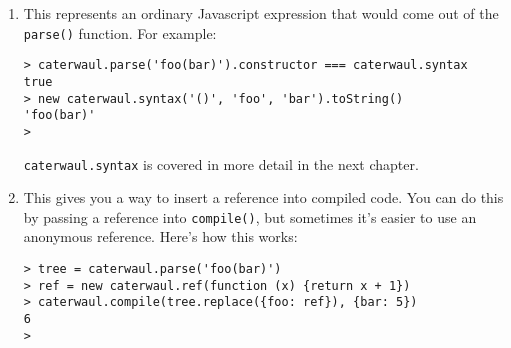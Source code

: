 \documentclass{report}
\begin{document}
\begin{enumerate}
\item[{\tt caterwaul.syntax}]
  This represents an ordinary Javascript expression that would come out of the {\tt parse()} function. For example:

\begin{verbatim}
> caterwaul.parse('foo(bar)').constructor === caterwaul.syntax
true
> new caterwaul.syntax('()', 'foo', 'bar').toString()
'foo(bar)'
>
\end{verbatim}

  {\tt caterwaul.syntax} is covered in more detail in the next chapter.

\item[{\tt caterwaul.ref}]
  This gives you a way to insert a reference into compiled code. You can do this by passing a reference into {\tt compile()}, but sometimes it's easier to use an anonymous reference.
  Here's how this works:

\begin{verbatim}
> tree = caterwaul.parse('foo(bar)')
> ref = new caterwaul.ref(function (x) {return x + 1})
> caterwaul.compile(tree.replace({foo: ref}), {bar: 5})
6
>
\end{verbatim}
\end{enumerate}
\end{document}
